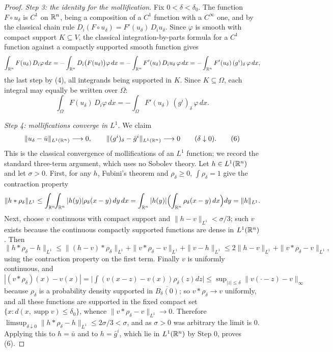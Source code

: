 \begin{proof}
\emph{Step 3: the identity for the mollification.}  Fix $0<\delta<\delta_0$.  The
function $F\circ u_\delta$ is $C^1$ on $\mathbb{R}^n$, being a composition of a $C^1$
function with a $C^\infty$ one, and by the classical chain rule
$D_i(F\circ u_\delta)=F'(u_\delta)\,D_iu_\delta$.  Since $\varphi$ is smooth with
compact support $K\subseteq V$, the classical integration-by-parts formula for a
$C^1$ function against a compactly supported smooth function gives
\[
\int_{\mathbb{R}^n}F(u_\delta)\,D_i\varphi\,dx
=-\int_{\mathbb{R}^n}D_i\bigl(F(u_\delta)\bigr)\varphi\,dx
=-\int_{\mathbb{R}^n}F'(u_\delta)\,D_iu_\delta\,\varphi\,dx
=-\int_{\mathbb{R}^n}F'(u_\delta)\,(g^i)_\delta\,\varphi\,dx ,
\]
the last step by (4), all integrands being supported in $K$.  Since
$K\subseteq\Omega$, each integral may equally be written over $\Omega$:
\[
\int_\Omega F(u_\delta)\,D_i\varphi\,dx
=-\int_\Omega F'(u_\delta)\,(g^i)_\delta\,\varphi\,dx .
\tag{5}
\]

\emph{Step 4: mollifications converge in $L^1$.}  We claim
\[
\|u_\delta-\bar u\|_{L^1(\mathbb{R}^n)}\longrightarrow0,\qquad
\|(g^i)_\delta-\bar g^i\|_{L^1(\mathbb{R}^n)}\longrightarrow0
\qquad(\delta\downarrow0).
\tag{6}
\]
This is the classical convergence of mollifications of an $L^1$ function; we
record the standard three-term argument, which uses no Sobolev theory.  Let
$h\in L^1(\mathbb{R}^n)$ and let $\sigma>0$.  First, for any $h$, Fubini's theorem and
$\rho_\delta\ge0$, $\int\rho_\delta=1$ give the contraction property
\[
\|h*\rho_\delta\|_{L^1}\le\int_{\mathbb{R}^n}\!\!\int_{\mathbb{R}^n}|h(y)|\rho_\delta(x-y)\,dy\,dx
=\int_{\mathbb{R}^n}|h(y)|\Bigl(\int_{\mathbb{R}^n}\rho_\delta(x-y)\,dx\Bigr)dy=\|h\|_{L^1}.
\]
Next, choose $v$ continuous with compact support and
$\|h-v\|_{L^1}<\sigma/3$; such $v$ exists because the continuous compactly
supported functions are dense in $L^1(\mathbb{R}^n)$.  Then
\[
\|h*\rho_\delta-h\|_{L^1}
\le\|(h-v)*\rho_\delta\|_{L^1}+\|v*\rho_\delta-v\|_{L^1}+\|v-h\|_{L^1}
\le2\|h-v\|_{L^1}+\|v*\rho_\delta-v\|_{L^1},
\]
using the contraction property on the first term.  Finally $v$ is uniformly
continuous, and
$|(v*\rho_\delta)(x)-v(x)|=\bigl|\int(v(x-z)-v(x))\rho_\delta(z)dz\bigr|
\le\sup_{|z|\le\delta}\|v(\cdot-z)-v\|_\infty$ because $\rho_\delta$ is a
probability density supported in $\overline{B_\delta(0)}$; so
$v*\rho_\delta\to v$ uniformly, and all these functions are supported in the
fixed compact set $\{x:d(x,\operatorname{supp}v)\le\delta_0\}$, whence
$\|v*\rho_\delta-v\|_{L^1}\to0$.  Therefore
$\limsup_{\delta\downarrow0}\|h*\rho_\delta-h\|_{L^1}\le2\sigma/3<\sigma$, and as
$\sigma>0$ was arbitrary the limit is $0$.  Applying this to $h=\bar u$ and to
$h=\bar g^i$, which lie in $L^1(\mathbb{R}^n)$ by Step 0, proves (6).


\end{proof}
